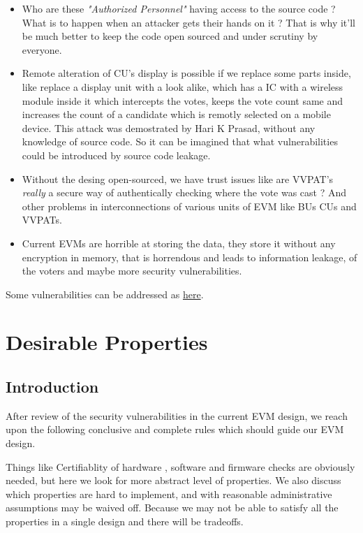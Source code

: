 \documentclass[12pt]{report}
\begin{document}
\begin{itemize}
  \label{sec:surv}
  \item Who are these \textit{"Authorized Personnel"} having access to the source code ? What is to happen when an attacker gets their hands on it ? That is why it'll be much better to keep the code open sourced and under scrutiny by everyone. 

  \item Remote alteration of CU's display is possible if we replace some parts inside, like replace a display unit with a look alike, which has a IC with a wireless module inside it which intercepts the votes, keeps the vote count same and increases the count of a candidate which is remotly selected on a mobile device.
  This attack was demostrated by Hari K Prasad, without any knowledge of source code. So it can be imagined that what vulnerabilities could be introduced by source code leakage.

  \item Without the desing open-sourced, we have trust issues like are VVPAT's \textit{really} a secure way of authentically checking where the vote was cast ? And other problems in interconnections of various units of EVM like BUs CUs and VVPATs. 

  \item Current EVMs are horrible at storing the data, they store it without any encryption in memory, that is horrendous and leads to information leakage, of the voters and maybe more security vulnerabilities.
\end{itemize}
Some vulnerabilities can be addressed as \hyperref[sec:addr]{here}.

\chapter{Desirable Properties}
\section{Introduction}
After review of the security vulnerabilities in the current EVM design, we reach upon the following conclusive and complete rules which should guide our EVM design.

Things like Certifiablity of hardware , software and firmware checks are obviously needed, but here we look for more abstract level of properties.
We also discuss which properties are hard to implement, and with reasonable administrative assumptions may be waived off. Because we may not be able to satisfy all the properties in a single design and there will be tradeoffs.
\end{document}
